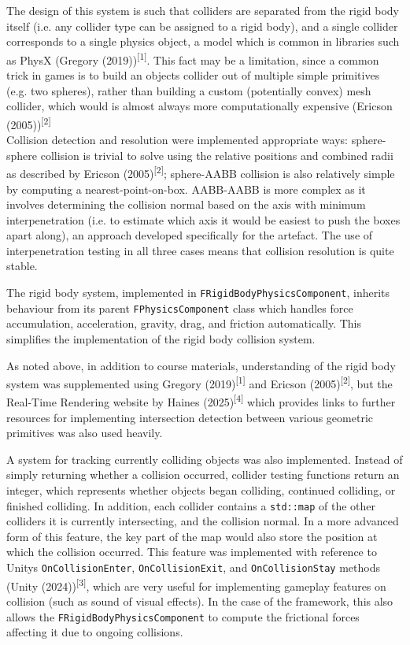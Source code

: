 \documentclass[
]{article}
\begin{document}
The design of this system is such that colliders are separated from the
rigid body itself (i.e. any collider type can be assigned to a rigid
body), and a single collider corresponds to a single physics object, a
model which is common in libraries such as PhysX (Gregory
(2019))\textsuperscript{{[}1{]}}. This fact may be a limitation, since a
common trick in games is to build an object\textquotesingle s collider
out of multiple simple primitives (e.g. two spheres), rather than
building a custom (potentially convex) mesh collider, which would is
almost always more computationally expensive (Ericson
(2005))\textsuperscript{{[}2{]}}\\
Collision detection and resolution were implemented appropriate ways:
sphere-sphere collision is trivial to solve using the relative positions
and combined radii as described by Ericson
(2005)\textsuperscript{{[}2{]}}; sphere-AABB collision is also
relatively simple by computing a nearest-point-on-box. AABB-AABB is more
complex as it involves determining the collision normal based on the
axis with minimum interpenetration (i.e. to estimate which axis it would
be easiest to push the boxes apart along), an approach developed
specifically for the artefact. The use of interpenetration testing in
all three cases means that collision resolution is quite stable.

The rigid body system, implemented in
\texttt{FRigidBodyPhysicsComponent}, inherits behaviour from its parent
\texttt{FPhysicsComponent} class which handles force accumulation,
acceleration, gravity, drag, and friction automatically. This simplifies
the implementation of the rigid body collision system.

As noted above, in addition to course materials, understanding of the
rigid body system was supplemented using Gregory
(2019)\textsuperscript{{[}1{]}} and Ericson
(2005)\textsuperscript{{[}2{]}}, but the Real-Time Rendering website by
Haines (2025)\textsuperscript{{[}4{]}} which provides links to further
resources for implementing intersection detection between various
geometric primitives was also used heavily.

A system for tracking currently colliding objects was also implemented.
Instead of simply returning whether a collision occurred, collider
testing functions return an integer, which represents whether objects
began colliding, continued colliding, or finished colliding. In
addition, each collider contains a \texttt{std::map} of the other
colliders it is currently intersecting, and the collision normal. In a
more advanced form of this feature, the key part of the map would also
store the position at which the collision occurred. This feature was
implemented with reference to Unity\textquotesingle s
\texttt{OnCollisionEnter}, \texttt{OnCollisionExit}, and
\texttt{OnCollisionStay} methods (Unity
(2024))\textsuperscript{{[}3{]}}, which are very useful for implementing
gameplay features on collision (such as sound of visual effects). In the
case of the framework, this also allows the
\texttt{FRigidBodyPhysicsComponent} to compute the frictional forces
affecting it due to ongoing collisions.
\end{document}
